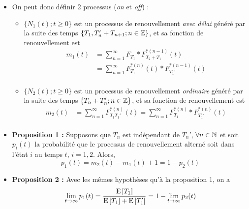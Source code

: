 \documentclass[10pt, french, landscape]{article}
\begin{document}
\begin{multicols*}{3}
\begin{itemize}
\item On peut donc définir 2 processus  (\emph{on} et \emph{off}) :  
\begin{itemize}
	\item $\{ N_1(t) ; t \geq 0 \}$ est un processus de renouvellement \emph{avec délai} généré par la suite des temps $\{ T_1, T_n' + T_{n+1} ; n \in \mathbb{Z} \}$, et sa fonction de renouvellement est
	\begin{align*}
	m_1(t) & = \sum_{n=1}^{\infty} F_{T_1} \ast F_{T_2 + T_1}
	^{\ast(n-1)}(t) \\
	& = \sum_{n=1}^{\infty} F_{T_1}^{\ast(n)}(t) \ast F_{T_1'}^{\ast(n-1)}(t) \\
	\end{align*}
	\item 	$\{ N_2(t) ; t \geq 0 \}$ est un processus de renouvellement \emph{ordinaire} généré par la suite des temps $\{ T_n + T_n'; n \in \mathbb{Z} \}$, et sa fonction de renouvellement est
	\begin{align*}
	m_2(t) &= \sum_{n=1}^{\infty} F_{T_1  T_1'}^{\ast(n)}(t) = \sum_{n=1}^{\infty} F_{T_1}^{\ast(n)} \ast F_{T_1'}^{\ast(n)}(t) \\
	\end{align*}
\end{itemize}
\item \textbf{Proposition 1 : } Supposons que $T_n$ est indépendant de $T_n'$, $\forall n \in \mathbb{N}$ et soit $p_i(t)$ la probabilité que le processus de renouvellement alterné soit dans l'état $i$ au temps $t$, $i=1,2$. Alors,
\[p_1(t) = m_2(t) - m_1(t) + 1 = 1 - p_2(t) \]

\item \textbf{Proposition 2 : } Avec les mêmes hypothèses qu'à la proposition 1, on a
\[\lim_{t \to \infty} p_1(t) = \frac{\mathrm{E} \left[ T_1 \right]}{\mathrm{E} \left[ T_1 \right] + \mathrm{E} \left[ T_1' \right]} = 1 - \lim_{t \to \infty} p_2(t) \]

\end{itemize}








\end{multicols*}

\end{document}
